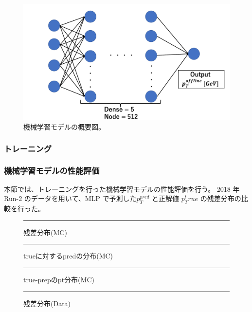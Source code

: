 \begin{figure}[tb]
  \centering
  \includegraphics[clip, width=12cm]{fig/4/MLP.pdf}
  \caption{機械学習モデルの概要図。}
  \label{fig:MLP_overview}
\end{figure}


\subsubsection{トレーニング}




\subsubsection{機械学習モデルの性能評価}
本節では、トレーニングを行った機械学習モデルの性能評価を行う。
2018 年 Run-2 のデータを用いて、MLP で予測した$p_{T}^{pred}$ と正解値 $p_{T}^true$ の残差分布の比較を行った。

\begin{figure}[tb]
  \centering
  \rule{8cm}{6cm}
  \caption{残差分布(MC)}
  \label{fig:fit_def}
\end{figure}

\begin{figure}[tb]
  \centering
  \rule{8cm}{6cm}
  \caption{trueに対するpredの分布(MC)}
  \label{fig:fit_def}
\end{figure}

\begin{figure}[tb]
  \centering
  \rule{8cm}{6cm}
  \caption{true-prepのpt分布(MC)}
  \label{fig:fit_def}
\end{figure}

\begin{figure}[tb]
  \centering
  \rule{8cm}{6cm}
  \caption{残差分布(Data)}
  \label{fig:fit_def}
\end{figure}

